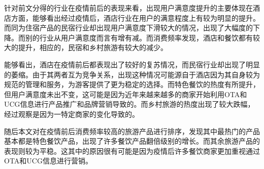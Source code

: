 \documentclass[bwprint]{gmcmthesis}
\begin{document}
针对前文分得的行业在疫情前后的表现来看，出现用户满意度提升的主要体现在酒店方面，能够看出经过疫情后，酒店行业在用户的满意程度上有较为明显的提升。而同为住宿产品的民宿行业却出现用户满意度下滑较大的情况，出现了大幅度的下降。而别的行业从用户满意度而言有增有减。而消费频率发现，酒店和餐饮都有较大的提升，相应的，民宿和乡村旅游有较大的减少。

能够看出，酒店在疫情前后都表现出了较好的复苏情况，而民宿行业却出现了明显的萎缩。由于其两者互为竞争关系，出现这种情况可能源自于酒店因为其自身较为规范的管理和服务，为游客提供了更为稳定的选择。而特色餐饮的热度有所提升，但用户满意度未出不变，这可能是因为近年来越来越多的商家开始利用OTA和UCG信息进行产品推广和品牌营销导致的。而乡村旅游的热度出现了较大跌幅，经过观察是因为一特定商家的变化导致的。

随后本文对在疫情前后消费频率较高的旅游产品进行排序，发现其中最热门的产品基本都是特色餐饮产品，出现了许多餐饮产品翻倍级别的增长。而其余旅游产品的表现则较为平稳。这其中的原因很有可能是因为疫情后许多餐饮商家更加重视通过OTA和UCG信息进行营销。









\end{document}
